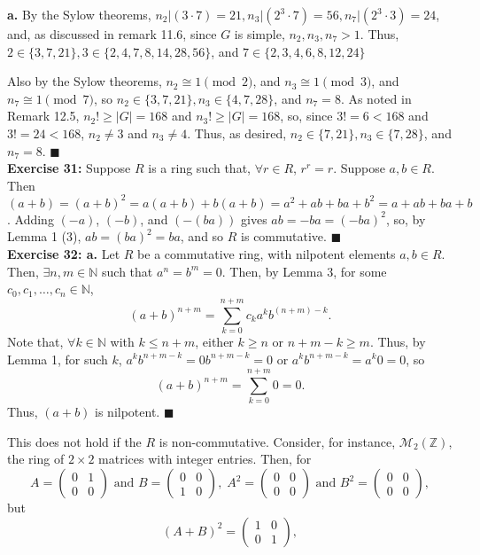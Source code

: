 \documentclass{article}%
\begin{document}
\textbf{a.} By the Sylow theorems, $n_2 | (3\cdot7) = 21, n_3 | (2^3\cdot7) =
56,n_7 | (2^3\cdot3) = 24$, and, as discussed in remark 11.6, since $G$ is
simple, $n_2, n_3,n_7 > 1$. Thus, $2 \in \{3,7,21\},3 \in \{2,4,7,8,14,28,56
\}$, and $7 \in \{2,3,4,6,8,12,24\}$

Also by the Sylow theorems, $n_2 \cong 1 \pmod 2$, and $n_3 \cong 1 \pmod 3$,
and $n_7 \cong 1 \pmod 7$, so $n_2 \in \{3,7,21\}, n_3 \in \{4,7,28\}$, and
$n_7 = 8$.
As noted in Remark 12.5, $n_2! \geq |G| = 168$ and $n_3! \geq |G| = 168$, so,
since $3! = 6 < 168$ and $3! = 24 < 168$, $n_2 \neq 3$ and $n_3 \neq 4$. Thus,
as desired, $n_2 \in \{7, 21\},n_3 \in \{7,28\}$, and $n_7 = 8$. \qquad
$\blacksquare$ \\

\textbf{Exercise 31:} Suppose $R$ is a ring such that, $\forall r \in R$,
$r^r = r$. Suppose $a, b \in R$. Then $(a + b) = (a + b)^2
 = a(a + b) + b(a + b) = a^2 + ab + ba + b^2 = a + ab + ba + b$. Adding
$(-a)$, $(-b)$, and $(-(ba))$ gives $ab = -ba = (-ba)^2$, so, by Lemma 1 (3),
$ab = (ba)^2 = ba$, and so $R$ is commutative. \qquad $\blacksquare$ \\

\textbf{Exercise 32: a.} Let $R$ be a commutative ring, with nilpotent
elements $a,b \in R$. Then, $\exists n,m \in \mathbb{N}$ such that $a^n = b^m
 = 0$. Then, by Lemma 3, for some $c_0,c_1,\ldots,c_n \in \mathbb{N}$,
\[(a + b)^{n + m} = \sum_{k = 0}^{n + m} c_k a^k b^{(n + m) - k}.\]
Note that, $\forall k \in \mathbb{N}$ with $k \leq n + m$, either $k \geq n$ or
$n + m - k \geq m$. Thus, by Lemma 1, for such $k$, $a^kb^{n + m - k} =
0b^{n + m - k} = 0$ or $a^kb^{n + m - k} = a^k0 = 0$, so
\[(a + b)^{n + m} = \sum_{k = 0}^{n + m} 0 = 0.\]
Thus, $(a + b)$ is nilpotent. \qquad $\blacksquare$

This does not hold if the $R$ is non-commutative. Consider, for instance,
$\mathcal{M}_2(\mathbb{Z})$, the ring of $2 \times 2$ matrices with integer
entries. Then, for
\[A = \left(\begin{array}{cc}
0 & 1 \\
0 & 0 \end{array} \right) \mbox{ and }
B = \left(\begin{array}{cc}
0 & 0 \\
1 & 0 \end{array} \right), \;
A^2 = \left(\begin{array}{cc}
0 & 0 \\
0 & 0 \end{array} \right) \mbox{ and }
B^2 = \left(\begin{array}{cc}
0 & 0 \\
0 & 0 \end{array} \right),
\]
but
\[(A + B)^2 = \left(\begin{array}{cc}
1 & 0 \\
0 & 1 \end{array} \right),
\]
\end{document}
